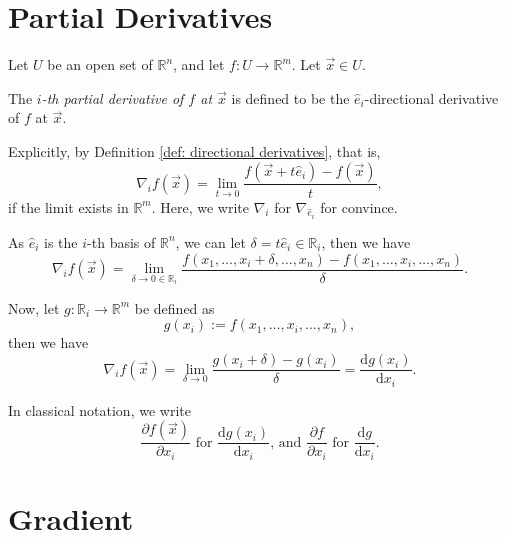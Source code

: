 

\section{Partial Derivatives}



\begin{definition}
	\label{def: partial derivatives}

	Let $U$ be an open set of $\mathbb R^n$, and let $f: U \to \mathbb R^m$. Let $\vec x \in U$.
	
	The \textit{$i$-th partial derivative of $f$ at $\vec x$} is defined to be the $\hat e_i$-directional derivative of $f$ at $\vec x$.
\end{definition}



\begin{note}
	Explicitly, by Definition \ref{def: directional derivatives}, that is,
	$$
	\nabla_{i} f(\vec x) = \lim_{t \to 0}\frac{f(\vec x + t \hat e_i) - f(\vec x)}{t},
	$$
	if the limit exists in $\mathbb R^m$. Here, we write $\nabla_i$ for $\nabla_{\hat e_i}$ for convince.
	
	As $\hat e_i$ is the $i$-th basis of $\mathbb R^n$, we can let $\delta = t \hat e_i \in \mathbb R_i$, then we have
	$$
	\nabla_i f(\vec x) = \lim_{\delta \to 0 \in \mathbb R_i} \frac{f(x_1, \ldots, x_i + \delta, \ldots , x_n) - f(x_1, \ldots, x_i, \ldots, x_n)}{\delta}.
	$$
	
	Now, let $g: \mathbb R_i \to \mathbb R^m$ be defined as
	$$
	g(x_i) := f(x_1, \ldots, x_i, \ldots, x_n),
	$$
	then we have
	$$
	\nabla_i f(\vec x) = \lim_{\delta \to 0} \frac{g(x_i + \delta) - g(x_i)}{\delta} = \frac{\mathrm d g(x_i)}{\mathrm d x_i}.
	$$
	
	In classical notation, we write
	$$
	\frac{\partial f(\vec x)}{\partial x_i} \text{ for } \frac{\mathrm d g(x_i)}{\mathrm d x_i} \text{, and } \frac{\partial f}{\partial x_i} \text{ for } \frac{\mathrm d g}{\mathrm d x_i}.
	$$
\end{note}






\section{Gradient}



